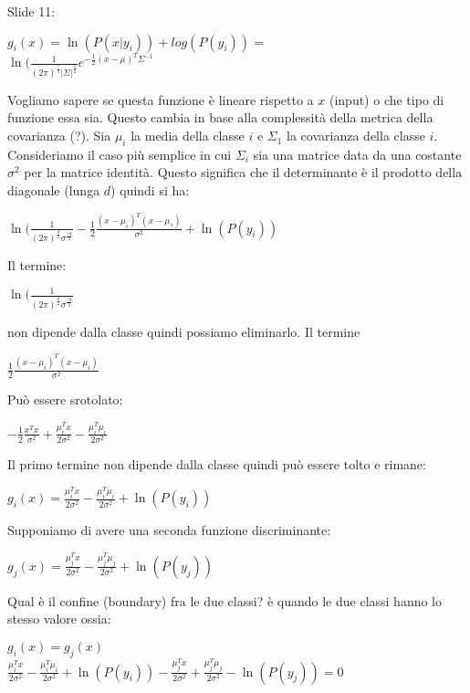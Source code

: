 Slide 11:
\begin{center}
	$\displaystyle g_i(x)=\ln(P(x\vert y_i))+log(P(y_i))=$\\
	$\ln(\frac{1}{(2\pi)^\frac{?}{3}\vert\Sigma\vert^\frac{1}{2}}e^{-\frac{1}{2}(x-\mu)^T\Sigma^{-1}}$
\end{center}
Vogliamo sapere se questa funzione è lineare rispetto a $x$ (input) o che tipo di funzione essa sia. Questo cambia in base alla complessità della metrica della covarianza (?). Sia $\mu_i$ la media della classe $i$ e $\Sigma_1$ la covarianza della classe $i$. \newline
Consideriamo il caso più semplice in cui $\Sigma_i$ sia una matrice data da una costante $\sigma^2$ per la matrice identità. Questo significa che il determinante è il prodotto della diagonale (lunga $d$) quindi si ha:
\begin{center}
	$\displaystyle \ln(\frac{1}{(2\pi)^{\frac{d}{2}}\sigma^{\frac{?d}{2}}}-\frac{1}{2}\frac{(x-\mu_i)^T(x-\mu_?)}{\sigma^2}+\ln(P(y_i))$
\end{center} 
Il termine: 
\begin{center}
	$\displaystyle \ln(\frac{1}{(2\pi)^{\frac{d}{2}}\sigma^{\frac{?d}{2}}}$
\end{center}
non dipende dalla classe quindi possiamo eliminarlo.\newline
Il termine 
\begin{center}
	$\displaystyle \frac{1}{2}\frac{(x-\mu_i)^T(x-\mu_i)}{\sigma^2}$
\end{center}
Può essere srotolato:
\begin{center}
	$\displaystyle -\frac{1}{2}\frac{x^Tx}{\sigma^2}+\frac{\mu^T_ix}{2\sigma^2}-\frac{\mu^T_i\mu_i}{2\sigma^2}$
\end{center}
Il primo termine non dipende dalla classe quindi può essere tolto e rimane:
\begin{center}
	$\displaystyle g_i(x)=\frac{\mu_i^Tx}{2\sigma^2}-\frac{\mu_i^T\mu_i}{2\sigma^2}+\ln(P(y_i))$
\end{center}
Supponiamo di avere una seconda funzione discriminante:
\begin{center}
	$\displaystyle g_j(x)=\frac{\mu_j^Tx}{2\sigma^2}-\frac{\mu_j^T\mu_j}{2\sigma^2}+\ln(P(y_j))$
\end{center}
Qual è il confine (boundary) fra le due classi? è quando le due classi hanno lo stesso valore ossia:
\begin{center}
	$\displaystyle g_i(x)=g_j(x)$\\
	$\displaystyle \frac{\mu_i^Tx}{2\sigma^2}-\frac{\mu_i^T\mu_i}{2\sigma^2}+\ln(P(y_i))-\frac{\mu_j^Tx}{2\sigma^2}+\frac{\mu_j^T\mu_j}{2\sigma^2}-\ln(P(y_j))=0$
\end{center}
